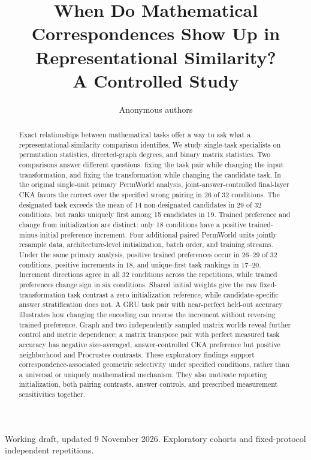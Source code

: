 \documentclass[10pt]{article}
\title{When Do Mathematical Correspondences Show Up in Representational Similarity?\\A Controlled Study}
\author{\name Anonymous authors}
\begin{document}
\maketitle
\begin{center}\small Working draft, updated 9 November 2026. Exploratory cohorts and fixed-protocol independent repetitions.\end{center}

\begin{abstract}
Exact relationships between mathematical tasks offer a way to ask what a
representational-similarity comparison identifies. We study single-task
specialists on permutation statistics, directed-graph degrees, and binary
matrix statistics. Two comparisons answer different questions: fixing the
task pair while changing the input transformation, and fixing the
transformation while changing the candidate task. In the original single-unit
primary PermWorld analysis, joint-answer-controlled final-layer CKA favors the correct over the
specified wrong pairing in 26 of 32 conditions. The designated task exceeds
the mean of 14 non-designated candidates in 29 of 32 conditions, but ranks
uniquely first among 15 candidates in 19. Trained preference and change from
initialization are distinct: only 18 conditions have a positive
trained-minus-initial preference increment. Four additional paired PermWorld
units jointly resample data, architecture-level initialization, batch order,
and training streams. Under the same primary analysis, positive trained
preferences occur in 26--29 of 32 conditions, positive increments in 18,
and unique-first task rankings in 17--20. Increment directions agree in all
32 conditions across the repetitions, while trained preferences change sign
in six conditions. Shared initial weights give the
raw fixed-transformation task contrast a zero initialization reference, while
candidate-specific answer stratification does not. A GRU task pair with near-perfect held-out accuracy illustrates how changing the encoding can reverse the increment
without reversing trained preference. Graph and two independently sampled
matrix worlds reveal further control and metric dependence; a matrix
transpose pair with perfect measured task accuracy has negative
size-averaged, answer-controlled CKA preference but
positive neighborhood and Procrustes contrasts. These exploratory findings
support correspondence-associated geometric selectivity under specified
conditions, rather than a universal or uniquely mathematical mechanism. They
also motivate reporting initialization, both pairing contrasts, answer
controls, and prescribed measurement sensitivities together.
\end{abstract}
\end{document}
